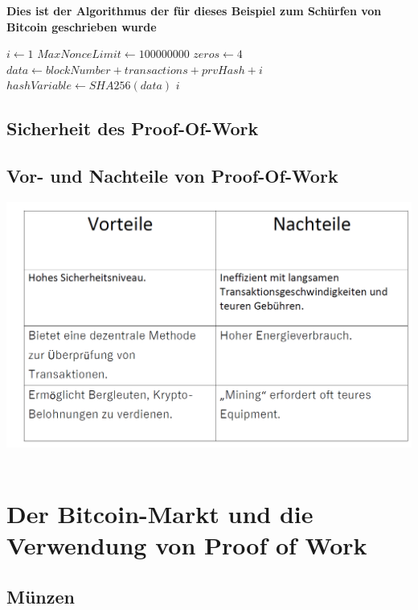 \documentclass[ngerman]{scrreprt}
\begin{document}
\begin{LARGE}
	\textbf{Dies ist der Algorithmus \textcommabelow der für dieses Beispiel zum Schürfen von Bitcoin geschrieben wurde} \\
\end{LARGE}
\begin{algorithmic}
	\State $i \gets 1$
	\State $MaxNonceLimit \gets 100000000$
	\State $zeros \gets 4$
		\State $data \gets blockNumber + transactions + prvHash + i$
		\State $hashVariable \gets  SHA256(data)$
			\Return $i$
		\EndIf
	\EndFor
	
\end{algorithmic}

\section{Sicherheit des Proof-Of-Work}

\section{Vor- und Nachteile von Proof-Of-Work}
\includegraphics[width=\linewidth]{vornach.png} \\ \\



\chapter{Der Bitcoin-Markt und die Verwendung von Proof of Work}
\section{Münzen}
\end{document}
